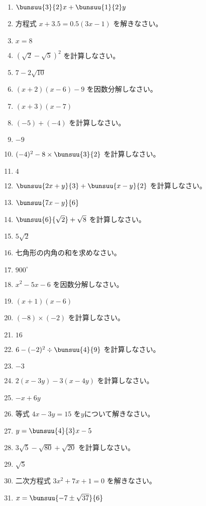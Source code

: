\documentclass[uplatex,a4j,11pt]{jsreport}
\begin{document}
\begin{multicols}{2}
\begin{enumerate}
    \item $\bunsuu{3}{2}x+\bunsuu{1}{2}y$
    \item 方程式 $x+3.5=0.5(3x-1)$ を解きなさい。%
    \item $x=8$
    \item $(\sqrt{2}-\sqrt{5})^2$ を計算しなさい。%
    \item $7-2\sqrt{10}$
    \item $(x+2)(x-6)-9$ を因数分解しなさい。%
    \item $(x+3)(x-7)$
    \item $(-5)+(-4)$ を計算しなさい。%
    \item $-9$
    \item $(-4)^2-8\times \bunsuu{3}{2}$ を計算しなさい。%
    \item $4$
    \item $\bunsuu{2x+y}{3}+\bunsuu{x-y}{2}$ を計算しなさい。%
    \item $\bunsuu{7x-y}{6}$
    \item $\bunsuu{6}{\sqrt{2}}+\sqrt{8}$ を計算しなさい。%
    \item $5\sqrt{2}$
    \item 七角形の内角の和を求めなさい。%
    \item $900^\circ$
    \item $x^2-5x-6$ を因数分解しなさい。%
    \item $(x+1)(x-6)$
    \item $(-8)\times (-2)$ を計算しなさい。%
    \item $16$
    \item $6-(-2)^2\div \bunsuu{4}{9}$ を計算しなさい。%
    \item $-3$
    \item $2(x-3y)-3(x-4y)$ を計算しなさい。%
    \item $-x+6y$
    \item 等式 $4x-3y=15$ を$y$について解きなさい。%
    \item $y=\bunsuu{4}{3}x-5$
    \item $3\sqrt{5}-\sqrt{80}+\sqrt{20}$ を計算しなさい。%
    \item $\sqrt{5}$
    \item 二次方程式 $3x^2+7x+1=0$ を解きなさい。%
    \item $x=\bunsuu{-7\pm\sqrt{37}}{6}$

\end{enumerate}
\end{multicols}
\end{document}
